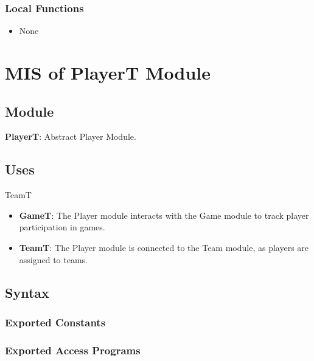 \documentclass[12pt, titlepage]{article}
\begin{document}
\begin{itemize}
\subsubsection{Local Functions}

\begin{itemize}
    \item None
\end{itemize}

\newpage

\section{MIS of PlayerT Module} \label{PlayerTModule}

\subsection{Module}
\textbf{PlayerT}: Abstract Player Module.
\subsection{Uses}
TeamT
\begin{itemize}
  \item \textbf{GameT}: The Player module interacts with the Game module to track player participation in games.
  \item \textbf{TeamT}: The Player module is connected to the Team module, as players are assigned to teams.
\end{itemize}

\subsection{Syntax}

\subsubsection{Exported Constants}

\subsubsection{Exported Access Programs}


\end{itemize}
\end{document}

